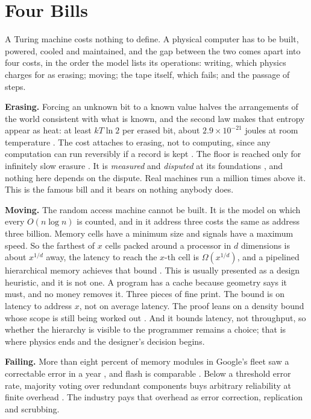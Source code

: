 \documentclass[11pt,oneside]{article}
\theoremstyle{definition}
\theoremstyle{remark}
\begin{document}
\section{Four Bills}\label{sec:bills}
A Turing machine costs nothing to define. A physical computer has to be built, powered,
cooled and maintained, and the gap between the two comes apart into four costs, in the
order the model lists its operations: writing, which physics charges for as erasing;
moving; the tape itself, which fails; and the passage of steps. 

\textbf{Erasing.} Forcing an unknown bit to a known value halves the arrangements of the
world consistent with what is known, and the second law makes that entropy appear as heat:
at least $kT\ln 2$ per erased bit, about $2.9\times10^{-21}$ joules at room temperature
\cite{landauer1961}. The cost attaches to erasing, not to computing, since any computation can
run reversibly if a record is kept \cite{bennett1973}. The floor is reached only for
infinitely slow erasure \cite{proesmans2020}. It is \emph{measured}
\cite{berut2012,jun2014,hong2016,yan2018} and \emph{disputed} at its foundations
\cite{earman1999,norton2005}, and nothing here depends on the dispute. Real machines run a
million times above it. This is the famous bill and it bears on nothing anybody does.

\textbf{Moving.} The random access machine cannot be built. It is the model on which every
$O(n\log n)$ is counted, and in it address three costs the same as address three billion. Memory cells have
a minimum size and signals have a maximum speed. So the farthest of $x$ cells packed
around a processor in $d$ dimensions is about $x^{1/d}$ away, the latency to reach the
$x$-th cell is $\Omega(x^{1/d})$, and a pipelined hierarchical memory achieves that bound
\cite{bilardi2009}. This is usually presented as a design heuristic, and it is not one. A
program has a cache because geometry says it must, and no money removes it. Three pieces
of fine print. The bound is on latency to address $x$, not on average latency. The proof
leans on a density bound whose scope is still being worked out \cite{hayden2025}. And it
bounds latency, not throughput, so whether the hierarchy is visible to the programmer
remains a choice; that is where physics ends and the designer's decision begins. 

\textbf{Failing.} More than eight percent of memory modules in Google's fleet saw a
correctable error in a year \cite{schroeder2009}, and flash is comparable \cite{meza2015}.
Below a threshold error rate, majority voting over redundant components buys arbitrary
reliability at finite overhead \cite{vonneumann1956}. The industry pays that overhead as
error correction, replication and scrubbing.
\end{document}
